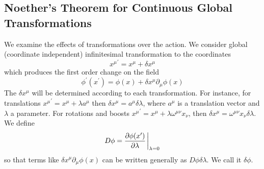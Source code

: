 \subsection{Noether's Theorem for Continuous Global Transformations}
We examine the effects of transformations over the action. We consider global (coordinate independent) infinitesimal transformation to the coordinates
 \begin{equation}
    {x^\mu}^\prime=x^\mu+\delta x^\mu
    \label{transf}
\end{equation}
which produces the first order change on the field
\begin{equation}
    \phi^\prime(x^\prime)=\phi(x)+{\delta x^\mu\partial_\mu\phi(x)}
\end{equation}
The $\delta x^\mu$ will be determined according to each transformation.
For instance, for translations ${x^\mu}^\prime = x^\mu+ \lambda a^\mu$ then $\delta x^\mu= a^\mu\delta \lambda$, where $a^\mu$ is a translation vector and $\lambda$ a parameter. For rotations and boosts ${x^\mu}^\prime=x^\mu+\lambda\omega^{\mu\nu}x_\nu$, then $\delta x^\mu= \omega^{\mu\nu}x_\nu\delta\lambda$. We define 
\begin{equation}
    D\phi=\pdv{\phi(x^\prime)}{\lambda}\eval_{\lambda=0}
\end{equation}
so that terms like $\delta x^\mu\partial_\mu\phi(x)$ can be written generally as $D\phi \delta\lambda$. We call it $\delta\phi$.\\

